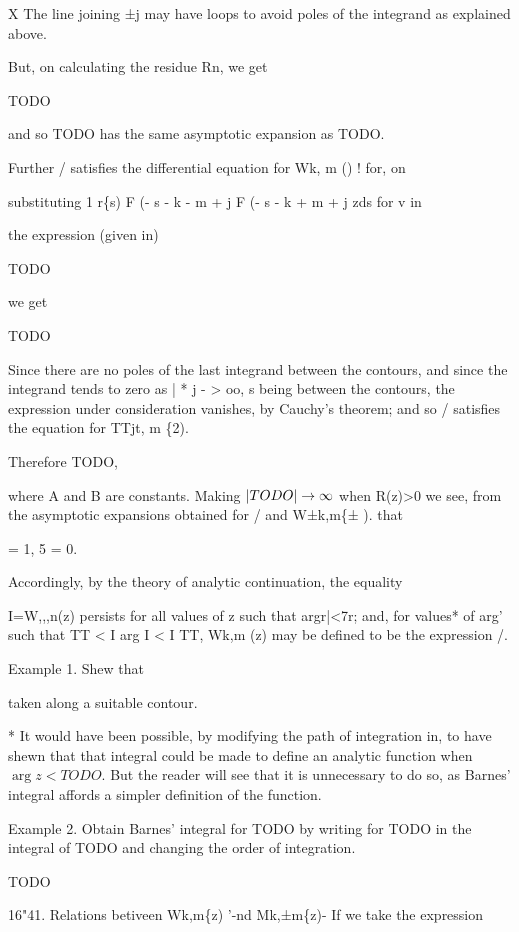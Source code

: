 X The line joining ±j may have loops to avoid poles of the integrand
as explained above.

%
%
But, on calculating the residue Rn, we get

TODO

and so TODO has the same asymptotic expansion as TODO.

Further / satisfies the differential equation for Wk, m () ! for, on

substituting 1 r\{s) F (- s - k - m + j F (- s - k + m + j zds
for v in

the expression (given in)

TODO

we get

TODO

Since there are no poles of the last integrand between the contours,
and since the integrand tends to zero as | * j - > oo, s being
between the contours, the expression under consideration vanishes, by
Cauchy's theorem; and so / satisfies the equation for TTjt, m \{2).

Therefore TODO,

where A and B are constants. Making $\left| TODO \right| \rightarrow \infty$
when R(z)>0 we see, from the asymptotic expansions obtained for / and
W±k,m\{± ). that

 = 1, 5 = 0.

Accordingly, by the theory of analytic continuation, the equality

I=W,,,n(z) persists for all values of z such that argr|<7r; and, for
values* of arg' such that TT < I arg  I < I TT, Wk,m (z) may be
defined to be the expression /.

Example 1. Shew that

taken along a suitable contour.

* It would have been possible, by modifying the path of integration in, to have shewn that that integral could be made to define an
analytic function when $\arg z < TODO$. But the reader will see that
it is unnecessary to do so, as Barnes' integral affords a simpler
definition of the function.

%
%

Example 2. Obtain Barnes' integral for TODO by writing for TODO in the
integral of TODO and changing the order of integration.

TODO

16"41. Relations betiveen Wk,m\{z) '-nd Mk,±m\{z)- If we take the
expression

